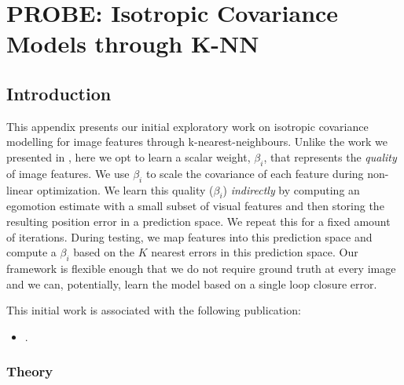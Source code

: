 \chapter{PROBE: Isotropic Covariance Models through K-NN}
\label{app:appendix_probe_knn}

\section{Introduction}

This appendix presents our initial exploratory work on isotropic covariance modelling for image features through k-nearest-neighbours. 
Unlike the work we presented in , here we opt to learn a scalar weight, $\beta_i$, that represents the \textit{quality} of image features. We use $\beta_i$ to scale the covariance of each feature during non-linear optimization. 
We learn this quality ($\beta_i$) \textit{indirectly} by computing an egomotion estimate with a small subset of visual features and then storing the resulting position error in a prediction space. We repeat this for a fixed amount of iterations. During testing, we map features into this prediction space and compute a $\beta_i$ based on the $K$ nearest errors in this prediction space. Our framework is flexible enough that we do not require ground truth at every image and we can, potentially, learn the model based on a single loop closure error. 

This initial work is associated with the following publication:
\begin{itemize}
\item {}.	
\end{itemize}


\subsection{Theory}


